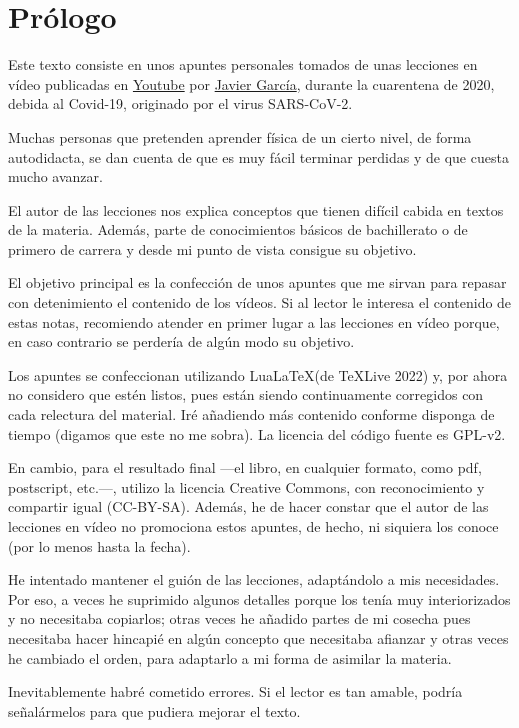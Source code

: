%

\chapter{Prólogo}
Este texto consiste en unos apuntes personales tomados de unas lecciones en
vídeo publicadas en
\href{https://www.youtube.com/playlist?list=PLAnA8FVrBl8BcfT7FX7Q4sKwHlaG-0Ej4}
{Youtube}
por \href{https://www.patreon.com/JavierGarcia/}{Javier García},
durante la cuarentena de 2020, debida al Covid-19, originado por el
virus SARS-CoV-2.

Muchas personas que pretenden aprender física de un cierto nivel, de forma
autodidacta, se dan cuenta de que es muy fácil terminar perdidas y de que
cuesta mucho avanzar.

El autor de las lecciones nos explica conceptos que tienen difícil cabida en
textos de la materia. Además, parte de conocimientos básicos de bachillerato o
de primero de carrera y desde mi punto de vista consigue su objetivo.

El objetivo principal es la confección de unos apuntes que me sirvan para
repasar con detenimiento el contenido de los vídeos. Si al lector le interesa
el contenido de estas notas, recomiendo atender en primer lugar a las
lecciones en vídeo porque, en caso contrario se perdería de algún modo su
objetivo.

Los apuntes se confeccionan utilizando Lua\LaTeX (de TeXLive 2022) y, por
ahora no considero que estén listos, pues están siendo continuamente corregidos
con cada relectura del material. Iré añadiendo más contenido conforme disponga
de tiempo (digamos que este no me sobra).
La licencia del código fuente es GPL-v2.

En cambio, para el resultado final ---el libro, en cualquier formato, como pdf,
postscript, etc.---, utilizo la licencia Creative Commons, con reconocimiento y
compartir igual (CC-BY-SA).
Además, he de hacer constar que el autor de las lecciones en vídeo no promociona
estos apuntes, de hecho, ni siquiera los conoce (por lo menos hasta la fecha).

He intentado mantener el guión de las lecciones, adaptándolo a mis necesidades.
Por eso, a veces he suprimido algunos detalles porque los tenía muy
interiorizados y no necesitaba copiarlos; otras veces he añadido partes de mi
cosecha pues necesitaba hacer hincapié en algún concepto que necesitaba
afianzar y otras veces he cambiado el orden, para adaptarlo a mi forma de
asimilar la materia.

Inevitablemente habré cometido errores. Si el lector es tan amable, podría
señalármelos para que pudiera mejorar el texto.


 
